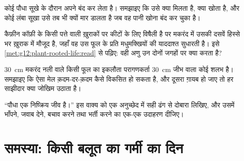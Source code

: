 \begin{exercise}[$\star\star\star$]\label{exo:g12:plant-rooted-life:12}
कोई पौधा सूखे के दौरान अपने  बंद कर लेता है। समझाइए कि उसे क्या मिलता
है, क्या खोता है, और कोई लंबा सूखा उसे तब भी क्यों मार डालता है जब वह पानी
खोना बंद कर चुका है।
\end{exercise}

\begin{exercise}[$\star\star\star$]\label{exo:g12:plant-rooted-life:13}
कैफ़ीन कॉफ़ी के किसी पत्ते वाली ख़ुराकों पर कीटों के लिए विषैली है पर
मकरंद में उसकी दसवें हिस्से भर ख़ुराक में मौजूद है, जहाँ वह उस फूल के प्रति
मधुमक्खियों की याददाश्त सुधारती है। इसे \cref{met:g12:plant-rooted-life:read}
से पढ़िए: वही अणु उन दोनों जगहों पर क्या करता है?
\end{exercise}

\begin{exercise}[$\star\star\star$]\label{exo:g12:plant-rooted-life:14}
\qty{30}{cm} मकरंद नली वाले किसी फूल का इकलौता परागणकर्ता \qty{30}{cm} जीभ
वाला कोई शलभ है। समझाइए कि ऐसा मेल क़दम-दर-क़दम कैसे विकसित हो सकता है, और
दूसरा ग़ायब हो जाए तो हर साझीदार क्या जोखिम उठाता है।
\end{exercise}

\begin{exercise}[$\star\star\star$]\label{exo:g12:plant-rooted-life:15}
``पौधा एक निष्क्रिय जीव है।'' इस वाक्य को एक अनुच्छेद में सही ढंग से दोबारा
लिखिए, और उसमें भाँपने, जवाब देने, बचाव करने तथा भर्ती करने का एक-एक उदाहरण
दीजिए।
\end{exercise}

\section{समस्या: किसी बलूत का गर्मी का दिन}

